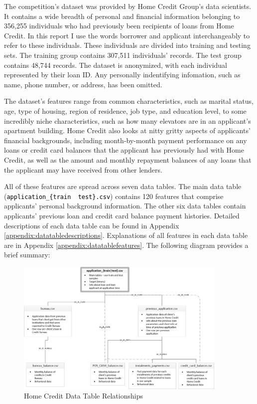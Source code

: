 \documentclass[12pt, letterpaper]{article}
\begin{document}
The competition's dataset was provided by Home Credit Group's data scientists. It contains a wide breadth of personal and financial information belonging to 356,255 individuals who had previously been recipients of loans from Home Credit. In this report I use the words borrower and applicant interchangeably to refer to these individuals. These individuals are divided into training and testing sets. The training group contains 307,511 individuals' records. The test group contains 48,744 records. The dataset is anonymized, with each individual represented by their loan ID. Any personally indentifying infomation, such as name, phone number, or address, has been omitted.

The dataset's features range from common characteristics, such as marital status, age, type of housing, region of residence, job type, and education level, to some incredibly niche characteristics, such as how many elevators are in an applicant's apartment building. Home Credit also looks at nitty gritty aspects of applicants' financial backgrounds, including month-by-month payment performance on any loans or credit card balances that the applicant has previously had with Home Credit, as well as the amount and monthly repayment balances of any loans that the applicant may have received from other lenders.

All of these features are spread across seven data tables. The main data table (\colorbox{backcolor}{\textcolor{black}{\texttt{application_\{train \textbar~test\}.csv}}}) contains 120 features that comprise applicants' personal background information. The other six data tables contain applicants' previous loan and credit card balance payment histories. Detailed descriptions of each data table can be found in Appendix \ref{appendix:datatabledescriptions}. Explanations of all features in each data table are in Appendix \ref{appendix:datatablefeatures}. The following diagram provides a brief summary:

\begin{figure}[ht]
\includegraphics[width=0.9\textwidth]{homecredit}
\centering
\caption{Home Credit Data Table Relationships\cite{kagglehomecreditcompetitiondata}}
\end{figure}
\end{document}
